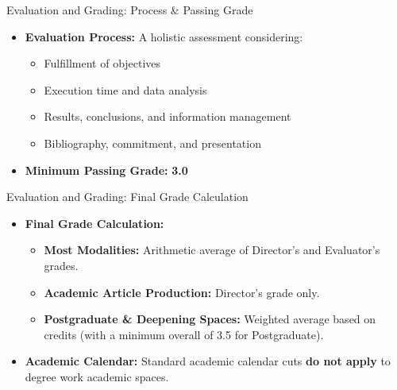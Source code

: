           \begin{frame}{Evaluation and Grading: Process \& Passing Grade}
            \begin{itemize}
              \item<1-> \textbf{Evaluation Process:} A holistic assessment considering:
                \begin{itemize}
                  \item<2-> Fulfillment of objectives
                  \item<3-> Execution time and data analysis
                  \item<4-> Results, conclusions, and information management
                  \item<5-> Bibliography, commitment, and presentation
                \end{itemize}
              \item<6-> \textbf{Minimum Passing Grade:} \textbf{3.0}
            \end{itemize}
          \end{frame}

          \begin{frame}{Evaluation and Grading: Final Grade Calculation}
            \begin{itemize}
              \item<1-> \textbf{Final Grade Calculation:}
                \begin{itemize}
                  \item<2-> \textbf{Most Modalities:} Arithmetic average of Director's and Evaluator's grades.
                  \item<3-> \textbf{Academic Article Production:} Director's grade only.
                  \item<4-> \textbf{Postgraduate \& Deepening Spaces:} Weighted average based on credits (with a minimum overall of 3.5 for Postgraduate).
                \end{itemize}
              \item<5-> \textbf{Academic Calendar:} Standard academic calendar cuts \textbf{do not apply} to degree work academic spaces.
            \end{itemize}
          \end{frame}


